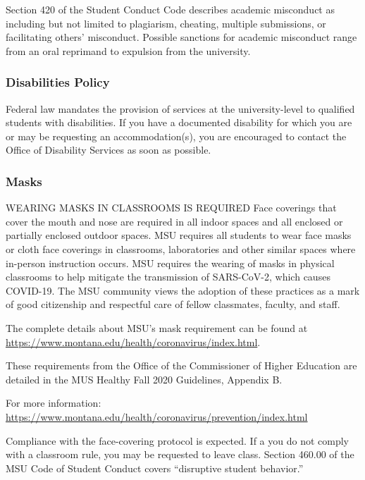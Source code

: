 \documentclass[11pt,]{article}
\begin{document}
Section 420 of the Student Conduct Code describes academic misconduct as
including but not limited to plagiarism, cheating, multiple submissions,
or facilitating others' misconduct. Possible sanctions for academic
misconduct range from an oral reprimand to expulsion from the
university.

\hypertarget{disabilities-policy}{%
\subsubsection{Disabilities Policy}\label{disabilities-policy}}

Federal law mandates the provision of services at the university-level
to qualified students with disabilities. If you have a documented
disability for which you are or may be requesting an accommodation(s),
you are encouraged to contact the Office of Disability Services as soon
as possible.

\hypertarget{masks}{%
\subsubsection{Masks}\label{masks}}

WEARING MASKS IN CLASSROOMS IS REQUIRED Face coverings that cover the
mouth and nose are required in all indoor spaces and all enclosed or
partially enclosed outdoor spaces. MSU requires all students to wear
face masks or cloth face coverings in classrooms, laboratories and other
similar spaces where in-person instruction occurs. MSU requires the
wearing of masks in physical classrooms to help mitigate the
transmission of SARS-CoV-2, which causes COVID-19. The MSU community
views the adoption of these practices as a mark of good citizenship and
respectful care of fellow classmates, faculty, and staff.

The complete details about MSU's mask requirement can be found at
\url{https://www.montana.edu/health/coronavirus/index.html}.

These requirements from the Office of the Commissioner of Higher
Education are detailed in the MUS Healthy Fall 2020 Guidelines, Appendix
B.

For more information:
\url{https://www.montana.edu/health/coronavirus/prevention/index.html}

Compliance with the face-covering protocol is expected. If a you do not
comply with a classroom rule, you may be requested to leave class.
Section 460.00 of the MSU Code of Student Conduct covers ``disruptive
student behavior.''
\end{document}
